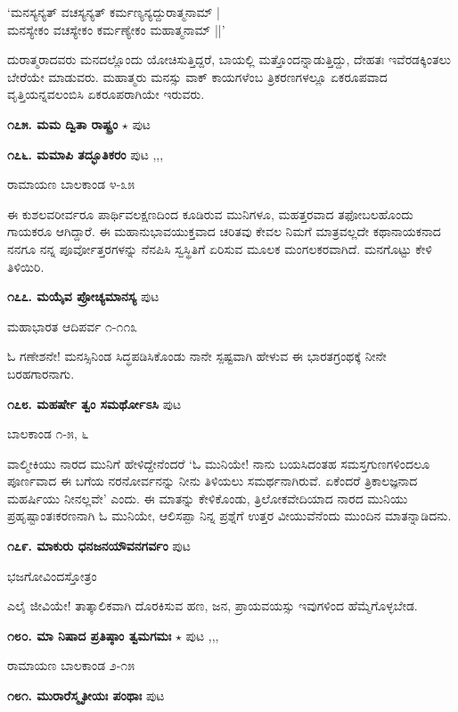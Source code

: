 \begin{shloka}
`ಮನಸ್ಯನ್ಯತ್ ವಚಸ್ಯನ್ಯತ್ ಕರ್ಮಣ್ಯನ್ಯದ್ದುರಾತ್ಮನಾಮ್ |\\
ಮನಸ್ಯೇಕಂ ವಚಸ್ಯೇಕಂ ಕರ್ಮಣ್ಯೇಕಂ ಮಹಾತ್ಮನಾಮ್ ||'
\end{shloka}

ದುರಾತ್ಮರಾದವರು ಮನದಲ್ಲೊಂದು ಯೋಚಿಸುತ್ತಿದ್ದರೆ, ಬಾಯಲ್ಲಿ ಮತ್ತೊಂದನ್ನಾಡುತ್ತಿದ್ದು, ದೇಹತಃ ಇವೆರಡಕ್ಕಿಂತಲು ಬೇರೆಯೇ ಮಾಡುವರು. ಮಹಾತ್ಮರು ಮನಸ್ಸು ವಾಕ್ ಕಾಯಗಳೆಂಬ ತ್ರಿಕರಣಗಳಲ್ಲೂ ಏಕರೂಪವಾದ ವೃತ್ತಿಯನ್ನವಲಂಬಿಸಿ ಏಕರೂಪರಾಗಿಯೇ ಇರುವರು.

\medskip
\noindent\textbf{೧೭೫. ಮಮ ದ್ವಿತಾ ರಾಷ್ಟ್ರಂ} $\star$ \hfill ಪುಟ \pageref{148}

\medskip
\noindent\textbf{೧೭೬. ಮಮಾಪಿ ತದ್ಭೂತಿಕರಂ} \hfill ಪುಟ \pageref{159},\pageref{168},\pageref{193},\pageref{211}

\hfill ರಾಮಾಯಣ ಬಾಲಕಾಂಡ ೪-೩೫

ಈ ಕುಶಲವರೀರ್ವರೂ ಪಾರ್ಥಿವಲಕ್ಷಣದಿಂದ ಕೂಡಿರುವ ಮುನಿಗಳೂ, ಮಹತ್ತರವಾದ ತಫೋಬಲಹೊಂದು ಗಾಯಕರೂ ಆಗಿದ್ದಾರೆ. ಈ ಮಹಾನುಭಾವಯುಕ್ತವಾದ ಚರಿತವು ಕೇವಲ ನಿಮಗೆ ಮಾತ್ರವಲ್ಲದೇ ಕಥಾನಾಯಕನಾದ ನನಗೂ ನನ್ನ ಪೂರ್ವೋತ್ತರಗಳನ್ನು ನೆನಪಿಸಿ ಸ್ವಸ್ಥಿತಿಗೆ ಏರಿಸುವ ಮೂಲಕ ಮಂಗಲಕರವಾಗಿದೆ. ಮನಗೊಟ್ಟು ಕೇಳಿ ತಿಳಿಯಿರಿ.

\medskip
\noindent\textbf{೧೭೭. ಮಯೈವ ಪ್ರೋಚ್ಯಮಾನಸ್ಯ} \hfill ಪುಟ \pageref{119}

\hfill ಮಹಾಭಾರತ ಆದಿಪರ್ವ ೧-೧೧೩

ಓ ಗಣೇಶನೇ! ಮನಸ್ಸಿನಿಂಡ ಸಿದ್ಧಪಡಿಸಿಕೊಂಡು ನಾನೇ ಸ್ಪಷ್ಟವಾಗಿ ಹೇಳುವ ಈ ಭಾರತಗ್ರಂಥಕ್ಕೆ ನೀನೇ ಬರಹಗಾರನಾಗು.

\medskip
\noindent\textbf{೧೭೮. ಮಹರ್ಷೇ ತ್ವಂ ಸಮರ್ಥೋಽಸಿ} \hfill ಪುಟ \pageref{246}

\hfill ಬಾಲಕಾಂಡ ೧-೫, ೬

ವಾಲ್ಮೀಕಿಯು ನಾರದ ಮುನಿಗೆ ಹೇಳಿದ್ದೇನೆಂದರೆ `ಓ ಮುನಿಯೇ! ನಾನು ಬಯಸಿದಂತಹ ಸಮಸ್ತಗುಣಗಳಿಂದಲೂ ಪೂರ್ಣವಾದ ಈ ಬಗೆಯ ನರನೋರ್ವನನ್ನು ನೀನು ತಿಳಿಯಲು ಸಮರ್ಥನಾಗಿರುವೆ. ಏಕೆಂದರೆ ತ್ರಿಕಾಲಜ್ಞನಾದ ಮಹರ್ಷಿಯು ನೀನಲ್ಲವೇ' ಎಂದು. ಈ ಮಾತನ್ನು ಕೇಳಿಕೊಂಡು, ತ್ರಿಲೋಕವೇದಿಯಾದ ನಾರದ ಮುನಿಯು ಪ್ರಹೃಷ್ಟಾಂತಃಕರಣನಾಗಿ ಓ ಮುನಿಯೇ, ಆಲಿಸಪ್ಪಾ ನಿನ್ನ ಪ್ರಶ್ನೆಗೆ ಉತ್ತರ ವೀಯುವೆನೆಂದು ಮುಂದಿನ ಮಾತನ್ನಾಡಿದನು.

\medskip
\noindent\textbf{೧೭೯. ಮಾಕುರು ಧನಜನಯೌವನಗರ್ವಂ} \hfill ಪುಟ \pageref{60}

\hfill ಭಜಗೋವಿಂದಸ್ತೋತ್ರಂ 

ಎಲೈ ಜೀವಿಯೇ! ತಾತ್ಕಾಲಿಕವಾಗಿ ದೊರಕಿಸುವ ಹಣ, ಜನ, ಪ್ರಾಯವಯಸ್ಸು ಇವುಗಳಿಂದ ಹೆಮ್ಮೆಗೊಳ್ಳಬೇಡ.

\medskip
\noindent\textbf{೧೮೦. ಮಾ ನಿಷಾದ ಪ್ರತಿಷ್ಠಾಂ ತ್ವಮಗಮಃ} $\star$ \hfill ಪುಟ \pageref{20},\pageref{157},\pageref{166},\pageref{200}

\hfill ರಾಮಾಯಣ ಬಾಲಕಾಂಡ ೨-೧೫

\medskip
\noindent\textbf{೧೮೧. ಮುರಾರೆಸ್ಮೃತೀಯಃ ಪಂಥಾಃ} \hfill ಪುಟ \pageref{43}

